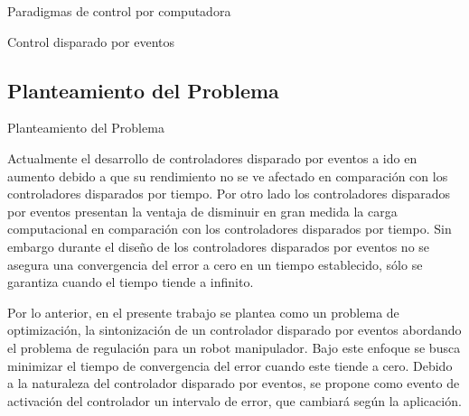 \begin{frame}[shrink=30]{Paradigmas de control por computadora}
\begin{block}{Control disparado por eventos}
\begin{figure}
\begin{center}
			\end{center}
		\end{figure}
	\end{block}
\end{frame}

\subsection{Planteamiento del Problema}
\begin{frame}[shrink=20]{Planteamiento del Problema}
\begin{block}{}
	\justifying
	Actualmente el desarrollo de controladores disparado por eventos a ido en aumento debido a que su rendimiento no se ve afectado en comparación con los controladores disparados por tiempo. Por otro lado los controladores disparados por eventos presentan la ventaja de disminuir en gran medida la carga computacional en comparación con los controladores disparados por tiempo. Sin embargo durante el diseño de los controladores disparados por eventos no se asegura una convergencia del error a cero en un tiempo establecido, sólo se garantiza cuando el tiempo tiende a infinito.
	
	Por lo anterior, en el presente trabajo se plantea como un problema de optimización, la sintonización de un controlador disparado por eventos abordando el problema de regulación para un robot manipulador. Bajo este enfoque se busca minimizar el tiempo de convergencia del error cuando este tiende a cero. Debido a la naturaleza del controlador disparado por eventos, se propone como evento de activación del controlador un intervalo de error, que cambiará según la aplicación.
\end{block}
\end{frame}

